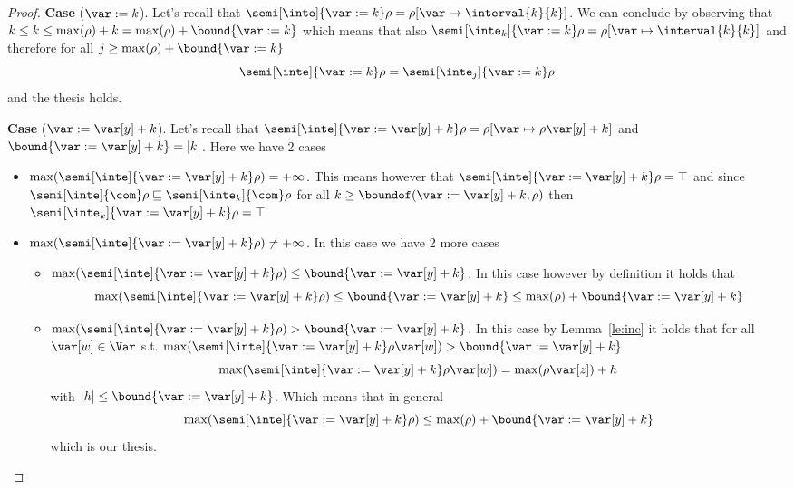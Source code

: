 \begin{proof}
  \medskip
  
  \noindent
  \textbf{Case} (\(\var := k\)).
  Let's recall that
  \({\semi[\inte]{\var := k}\rho = \rho[\var \mapsto \interval{k}{k}
    ]}\). We can conclude by observing that
  \({k \leq k \leq \max(\rho) + k = \max(\rho) + \bound{\var := k}}\)
  which means that also
  \({\semi[\inte_k]{\var := k}\rho = \rho[\var \mapsto
    \interval{k}{k}]}\) and therefore for all
  \(j\geq \max(\rho) + \bound{\var := k}\)
  \begin{equation*}
    \semi[\inte]{\var := k}\rho = \semi[\inte_j]{\var := k}\rho
  \end{equation*}
  and the thesis holds.

  \medskip
  
  \noindent
  \textbf{Case} (\(\var := \var[y] + k\)).
  Let's recall that
  \({\semi[\inte]{\var := \var[y] + k}\rho = \rho[\var \mapsto
    \rho\var[y] + k]}\) and \(\bound{\var := \var[y] + k} =
  |k|\). Here we have 2 cases
  \begin{itemize}
  \item \({\max(\semi[\inte]{\var := \var[y] + k}\rho) =
      +\infty}\). This means however that
    \({\semi[\inte]{\var := \var[y] + k}\rho = \top}\) and since
    \(\semi[\inte]{\com}\rho \sqsubseteq \semi[\inte_k]{\com}\rho\)
    for all \(k\geq \boundof(\var := \var[y] + k,\rho)\) then
    \({\semi[\inte_k]{\var := \var[y] + k}\rho = \top}\)
  \item
    \({\max(\semi[\inte]{\var := \var[y] + k}\rho) \neq +\infty}\). In
    this case we have 2 more cases
    \begin{itemize}
    \item
      \({\max(\semi[\inte]{\var := \var[y] + k}\rho) \leq \bound{\var
          := \var[y] + k}}\). In this case however by definition it
      holds that
      \begin{equation*}
        \max(\semi[\inte]{\var := \var[y] + k}\rho) \leq \bound{\var := \var[y] + k} \leq \max(\rho) + \bound{\var := \var[y] + k}
      \end{equation*}
      
    \item
      \({\max(\semi[\inte]{\var := \var[y] + k}\rho) > \bound{\var :=
          \var[y] + k}}\). In this case by Lemma~\ref{le:inc} it holds
      that for all \(\var[w]\in\Var\) s.t.
      \({\max(\semi[\inte]{\var := \var[y] + k}\rho\var[w]) >
        \bound{\var := \var[y] + k}}\)
      \begin{equation*}
        \max(\semi[\inte]{\var := \var[y] + k}\rho\var[w]) = \max(\rho\var[z]) + h
      \end{equation*}
      with \(|h| \leq \bound{\var := \var[y] + k}\). Which means that
      in general
      \begin{equation*}
        \max(\semi[\inte]{\var := \var[y] + k}\rho) \leq \max(\rho) + \bound{\var := \var[y] + k}
      \end{equation*}
      which is our thesis.
    \end{itemize}
  \end{itemize}
  

\end{proof}

